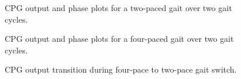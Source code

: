 				\begin{figure}
					\centering
					\caption{CPG output and phase plots for a two-paced gait over two gait cycles.}
					\label{fig::cpg_phase2_45}
				\end{figure}
				\begin{figure}
					\centering
					\caption{CPG output and phase plots for a four-paced gait over two gait cycles.}
					\label{fig::cpg_phase4_45}
				\end{figure}
				\begin{figure}
					\centering
					\caption{CPG output transition during four-pace to two-pace gait switch.}
					\label{fig::cpg_transition}
				\end{figure}	

